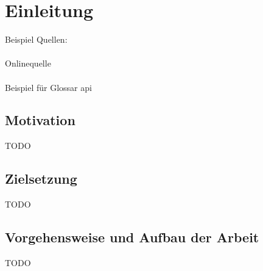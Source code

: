 \chapter{Einleitung}
Beispiel Quellen: \cite{LSVRC}
\\
\\
Onlinequelle \cite{LeCuCNN}
\\
\\
Beispiel für Glossar \gls{api}

\section{Motivation}
TODO

\section{Zielsetzung}
TODO

\section{Vorgehensweise und Aufbau der Arbeit}
TODO